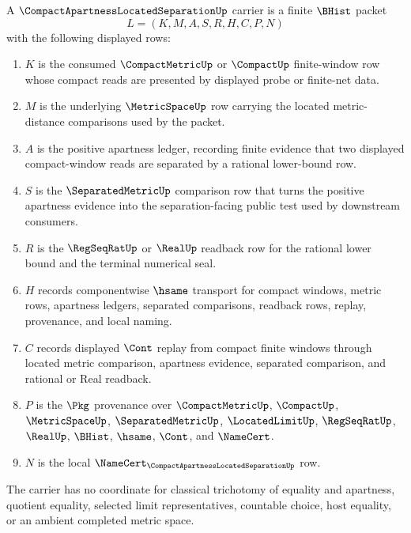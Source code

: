 \begin{definition}
\label{def:compact-apartness-located-separation-carrier}
A $\CompactApartnessLocatedSeparationUp$ carrier is a finite $\BHist$ packet
$$
L=(K,M,A,S,R,H,C,P,N)
$$
with the following displayed rows:
\begin{enumerate}
\item $K$ is the consumed $\CompactMetricUp$ or $\CompactUp$ finite-window row whose compact reads are presented by displayed probe or finite-net data.
\item $M$ is the underlying $\MetricSpaceUp$ row carrying the located metric-distance comparisons used by the packet.
\item $A$ is the positive apartness ledger, recording finite evidence that two displayed compact-window reads are separated by a rational lower-bound row.
\item $S$ is the $\SeparatedMetricUp$ comparison row that turns the positive apartness evidence into the separation-facing public test used by downstream consumers.
\item $R$ is the $\RegSeqRatUp$ or $\RealUp$ readback row for the rational lower bound and the terminal numerical seal.
\item $H$ records componentwise $\hsame$ transport for compact windows, metric rows, apartness ledgers, separated comparisons, readback rows, replay, provenance, and local naming.
\item $C$ records displayed $\Cont$ replay from compact finite windows through located metric comparison, apartness evidence, separated comparison, and rational or Real readback.
\item $P$ is the $\Pkg$ provenance over $\CompactMetricUp$, $\CompactUp$, $\MetricSpaceUp$, $\SeparatedMetricUp$, $\LocatedLimitUp$, $\RegSeqRatUp$, $\RealUp$, $\BHist$, $\hsame$, $\Cont$, and $\NameCert$.
\item $N$ is the local $\NameCert_{\CompactApartnessLocatedSeparationUp}$ row.
\end{enumerate}
The carrier has no coordinate for classical trichotomy of equality and apartness, quotient equality, selected limit representatives, countable choice, host equality, or an ambient completed metric space.
\end{definition}

